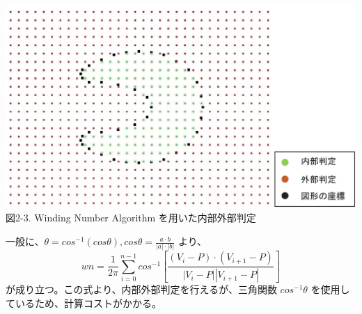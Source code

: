  \vspace{-5mm}
\begin{center}
  \includegraphics[width=14cm]{iedecision_2d.eps} \\
 \vspace{-10mm}
  図2-3. Winding Number Algorithm を用いた内部外部判定
\end{center}

一般に、$\theta = cos^{-1}(cos \theta), cos \theta = \frac{a \cdot b}{|a| \cdot |b|}$ より、
\[
wn = \frac{1}{2\pi}\sum_{i=0}^{n-1}cos^{-1}\left[\frac{(V_i - P) \cdot (V_{i+1} - P)}{|V_i - P||V_{i+1} - P|}\right]
\]
が成り立つ。この式より、内部外部判定を行えるが、三角関数 $cos^{-1} \theta$ を使用しているため、計算コストがかかる。















